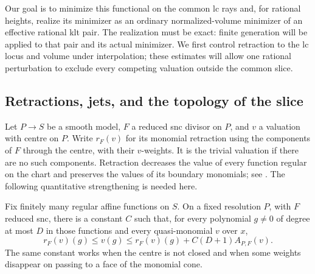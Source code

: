 Our goal is to minimize this functional on the common lc rays and,
for rational heights, realize its minimizer as an ordinary
normalized-volume minimizer of an effective rational klt pair.
The realization must be exact: finite generation will be applied to
that pair and its actual minimizer. We first control retraction to
the lc locus and volume under interpolation; these estimates will
allow one rational perturbation to exclude every competing valuation
outside the common slice.

\subsection{Retractions, jets, and the topology of the slice}

Let $P\to S$ be a smooth model, $F$ a reduced snc divisor on $P$, and
$v$ a valuation with centre on $P$. Write $r_F(v)$ for its monomial
retraction using the components of $F$ through the centre, with their
$v$-weights. It is the trivial valuation if there are no such components.
Retraction decreases the value of every function regular on the chart
and preserves the values of its boundary monomials; see
\cite[Lemma~4.7, Corollary~4.8, and Proposition~5.1]{JonssonMustata}.
The following quantitative strengthening is needed here.

\begin{lemma}\label{lem:E-log-jet}
Fix finitely many regular affine functions on $S$. On a fixed resolution
$P$, with $F$ reduced snc, there is a constant $C$ such that, for every
polynomial $g\ne0$ of degree at most $D$ in those functions and every
quasi-monomial $v$ over $x$,
\begin{equation}\label{eq:E-jet}
 r_F(v)(g)\le v(g)\le r_F(v)(g)+C(D+1)A_{P,F}(v).
\end{equation}
The same constant works when the centre is not closed and when some
weights disappear on passing to a face of the monomial cone.
\end{lemma}

